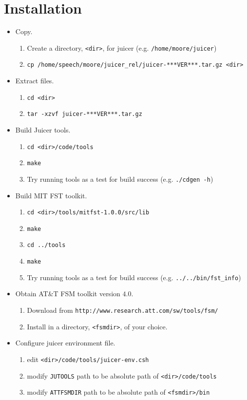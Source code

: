 \documentclass[a4paper,12pt]{report}
\begin{document}
\chapter{Installation}
\label{chap:installation}



\begin{itemize}
\item Copy.
\begin{enumerate}
   \item Create a directory, {\tt <dir>}, for juicer (e.g. {\tt /home/moore/juicer})
   \item {\tt cp /home/speech/moore/juicer\_rel/juicer-***VER***.tar.gz <dir>}
\end{enumerate}
\item Extract files.
\begin{enumerate}
   \item {\tt cd <dir>}
   \item {\tt tar -xzvf juicer-***VER***.tar.gz}
\end{enumerate}
\item Build Juicer tools.
\begin{enumerate}
   \item {\tt cd <dir>/code/tools}
   \item {\tt make}
   \item Try running tools as a test for build success (e.g. {\tt ./cdgen -h})
\end{enumerate}
\item Build MIT FST toolkit.
\begin{enumerate}
   \item {\tt cd <dir>/tools/mitfst-1.0.0/src/lib}
   \item {\tt make}
   \item {\tt cd ../tools}
   \item {\tt make}
   \item Try running tools as a test for build success (e.g. {\tt ../../bin/fst\_info})
\end{enumerate}
\item Obtain AT\&T FSM toolkit version $4.0$.
\begin{enumerate}
   \item Download from {\tt http://www.research.att.com/sw/tools/fsm/}
   \item Install in a directory, {\tt <fsmdir>}, of your choice.
\end{enumerate}
\item Configure juicer environment file.
\begin{enumerate}
   \item edit {\tt <dir>/code/tools/juicer-env.csh}
   \item modify {\tt JUTOOLS} path to be absolute path of {\tt <dir>/code/tools}
   \item modify {\tt ATTFSMDIR} path to be absolute path of {\tt <fsmdir>/bin}
\end{enumerate}
\end{itemize}
\end{document}
